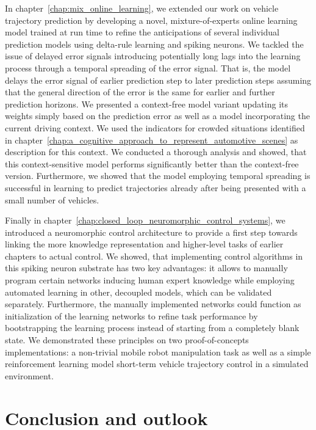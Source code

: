 In chapter~\ref{chap:mix_online_learning}, we extended our work on vehicle trajectory prediction by developing a novel, mixture-of-experts online learning model trained at run time to refine the anticipations of several individual prediction models using delta-rule learning and spiking neurons.
We tackled the issue of delayed error signals introducing potentially long lags into the learning process through a temporal spreading of the error signal.
That is, the model delays the error signal of earlier prediction step to later prediction steps assuming that the general direction of the error is the same for earlier and further prediction horizons.
We presented a context-free model variant updating its weights simply based on the prediction error as well as a model incorporating the current driving context.
We used the indicators for crowded situations identified in chapter~\ref{chap:a_cognitive_approach_to_represent_automotive_scenes} as description for this context.
We conducted a thorough analysis and showed, that this context-sensitive model performs significantly better than the context-free version.
Furthermore, we showed that the model employing temporal spreading is successful in learning to predict trajectories already after being presented with a small number of vehicles.

Finally in chapter~\ref{chap:closed_loop_neuromorphic_control_systems}, we introduced a neuromorphic control architecture to provide a first step towards linking the more knowledge representation and higher-level tasks of earlier chapters to actual control. 
We showed, that implementing control algorithms in this spiking neuron substrate has two key advantages: it allows to manually program certain networks inducing human expert knowledge while employing automated learning in other, decoupled models, which can be validated separately.
Furthermore, the manually implemented networks could function as initialization of the learning networks to refine task performance by bootstrapping the learning process instead of starting from a completely blank state.
We demonstrated these principles on two proof-of-concepts implementations: a non-trivial mobile robot manipulation task as well as a simple reinforcement learning model short-term vehicle trajectory control in a simulated environment.

\section{Conclusion and outlook}%
\label{sec:conclusion_and_outlook}

